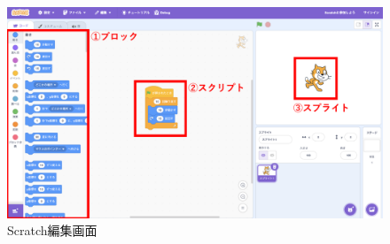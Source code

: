 \documentclass[11pt]{jreport}
\begin{document}
\begin{figure}[h]
\centerline{\includegraphics[width=0.8\linewidth]{@BSthesis2024_Horio/BSthesis2024_Horio_fig/scratch-edt.pdf}}
\caption{Scratch編集画面}
\label{fig:scratch-edt}
\end{figure}
\end{document}
